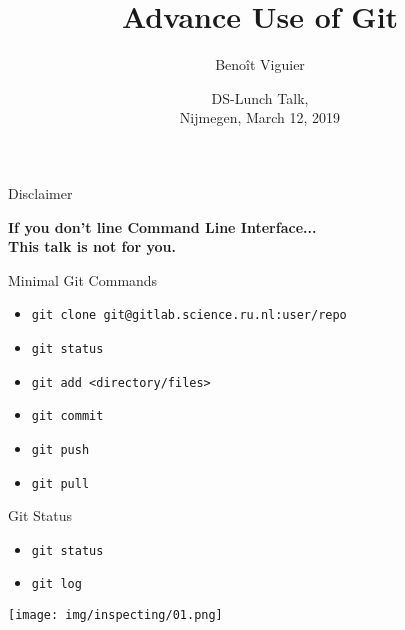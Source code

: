\documentclass[usenames,dvipsnames,handout,9pt]{beamer}
\title{Advance Use of Git}
\author[Viguier]
{Beno\^{i}t Viguier}
\date[Short Occasion]{\vspace{0.5cm}DS-Lunch Talk,\\Nijmegen, March 12, 2019}
\begin{document}

\begin{frame}
  \titlepage
\end{frame}


\begin{frame}{Disclaimer}
\begin{center}
  \alert{\Large{\textbf{If you don't line Command Line Interface...\\This talk is not for you.}}}
\end{center}
\end{frame}

\begin{frame}{Minimal Git Commands}
  \begin{itemize}
    \item \lstinline|git clone git@gitlab.science.ru.nl:user/repo|
    \item \lstinline|git status|
    \item \lstinline|git add <directory/files>|
    \item \lstinline|git commit|
    \item \lstinline|git push|
    \item \lstinline|git pull|
  \end{itemize}
\end{frame}



%
%
\begin{frame}{Git Status}
\begin{itemize}
  \item \lstinline|git status|
  \item \lstinline|git log|
\end{itemize}

\texttt{[image: img/inspecting/01.png]}
\end{frame}
\end{document}
